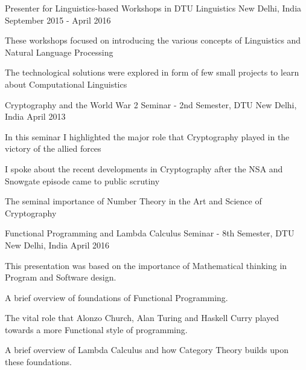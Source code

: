 \begin{cventries}
  \cventry
    {Presenter for Linguistics-based Workshops in DTU }
    {Linguistics}
    {New Delhi, India}
    {September 2015 - April 2016}
    {
      \begin{cvitems}
        \item {These workshops focused on introducing the various concepts of Linguistics and Natural Language Processing}
         \item {The technological solutions were explored in form of few small projects to learn about Computational Linguistics}
      \end{cvitems}
    }
 \cventry
    {Cryptography and the World War 2}
    {Seminar - 2nd Semester, DTU}
    {New Delhi, India}
    {April 2013}
    {
      \begin{cvitems}
        \item {In this seminar I highlighted the major role that Cryptography played in the victory of the allied forces}
         \item {I spoke about the recent developments in Cryptography after the NSA and Snowgate episode came to public scrutiny}
         \item {The seminal importance of Number Theory in the Art and Science of Cryptography}
      \end{cvitems}
    }

 \cventry
    {Functional Programming and Lambda Calculus}
    {Seminar - 8th Semester, DTU}
    {New Delhi, India}
    {April 2016}
    {
      \begin{cvitems}
        \item {This presentation was based on the importance of Mathematical thinking in Program and Software design.}
         \item {A brief overview of foundations of Functional Programming.}
         \item {The vital role that Alonzo Church, Alan Turing and Haskell Curry played towards a more Functional style of programming.}
         \item {A brief overview of Lambda Calculus and how Category Theory builds upon these foundations.}         
      \end{cvitems}
    }


\end{cventries}
